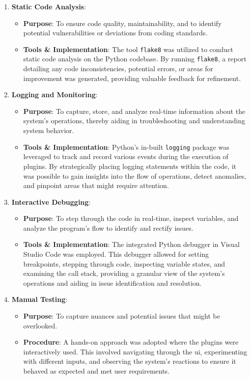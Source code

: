\documentclass[
  a4paper,  %
  twoside,  %
  bibliography=totoc,
  headsepline,
  cleardoublepage=empty,
  parskip=half,
  draft=false
]{scrbook}
\begin{document}
\begin{enumerate}
    \item \textbf{Static Code Analysis}:
    \begin{itemize}
        \item \textbf{Purpose}: To ensure code quality, maintainability, and to identify potential vulnerabilities or deviations from coding standards.
        \item \textbf{Tools \& Implementation}: The tool \texttt{flake8} was utilized to conduct static code analysis on the Python codebase.
        By running \texttt{flake8}, a report detailing any code inconsistencies, potential errors, or areas for improvement was generated, providing valuable feedback for refinement.
    \end{itemize}

    \item \textbf{Logging and Monitoring}:
    \begin{itemize}
        \item \textbf{Purpose}: To capture, store, and analyze real-time information about the system's operations, thereby aiding in troubleshooting and understanding system behavior.
        \item \textbf{Tools \& Implementation}: Python's in-built \texttt{logging} package was leveraged to track and record various events during the execution of plugins.
        By strategically placing logging statements within the code, it was possible to gain insights into the flow of operations, detect anomalies, and pinpoint areas that might require attention.
    \end{itemize}

    \item \textbf{Interactive Debugging}:
    \begin{itemize}
        \item \textbf{Purpose}: To step through the code in real-time, inspect variables, and analyze the program's flow to identify and rectify issues.
        \item \textbf{Tools \& Implementation}: The integrated Python debugger in Visual Studio Code was employed.
        This debugger allowed for setting breakpoints, stepping through code, inspecting variable states, and examining the call stack, providing a granular view of the system's operations and aiding in issue identification and resolution.
    \end{itemize}

    \item \textbf{Manual Testing}:
    \begin{itemize}
        \item \textbf{Purpose}: To capture nuances and potential issues that might be overlooked.
        \item \textbf{Procedure}: A hands-on approach was adopted where the plugins were interactively used.
        This involved navigating through the \gls{ui}, experimenting with different inputs, and observing the system's reactions to ensure it behaved as expected and met user requirements.
    \end{itemize}
\end{enumerate}
\end{document}
